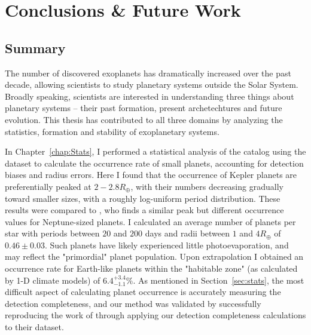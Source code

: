 \chapter{Conclusions \& Future Work}

\section{Summary}
The number of discovered exoplanets has dramatically increased over the past decade, allowing scientists to study planetary systems outside the Solar System. 
Broadly speaking, scientists are interested in understanding three things about planetary systems -- their past formation, present archetechtures and future evolution. 
This thesis has contributed to all three domains by analyzing the statistics, formation and stability of exoplanetary systems. 

In Chapter~\ref{chap:Stats}, I performed a statistical analysis of the \kep catalog using the \citet{Ramirez2014} dataset to calculate the occurrence rate of small planets, accounting for detection biases and radius errors. 
Here I found that the occurrence of Kepler planets are preferentially peaked at $2-2.8R_\oplus$, with their numbers decreasing gradually toward smaller sizes, with a roughly log-uniform period distribution.
These results were compared to \citet{Petigura2013}, who finds a similar peak but different occurrence values for Neptune-sized planets. 
I calculated an average number of planets per star with periods between $20$ and $200$ days and radii between $1$ and $4R_\oplus$ of $0.46 \pm 0.03$. 
Such planets have likely experienced little photoevaporation, and may reflect the "primordial" planet population. 
Upon extrapolation I obtained an occurrence rate for Earth-like planets within the "habitable zone" (as calculated by 1-D climate models) of $6.4^{+3.4}_{-1.1}\%$. 
As mentioned in Section~\ref{sec:stats}, the most difficult aspect of calculating planet occurrence is accurately measuring the detection completeness, and our method was validated by successfully reproducing the work of \citet{Petigura2013} through applying our detection completeness calculations to their dataset.


